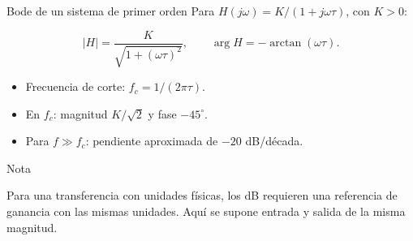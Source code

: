 \documentclass[
  10pt,
  ignorenonframetext,
  aspectratio=169,
  spanish,
]{beamer}
\providecommand{\tightlist}{%
  \setlength{\itemsep}{0pt}\setlength{\parskip}{0pt}}
\begin{document}
\begin{frame}{Bode de un sistema de primer orden}
\label{d3-045}
Para \(H(j\omega)=K/(1+j\omega\tau)\), con \(K>0\):

\[|H|=\frac{K}{\sqrt{1+(\omega\tau)^2}},\qquad
\arg H=-\arctan(\omega\tau).\]

\begin{itemize}
\tightlist
\item
  Frecuencia de corte: \(f_c=1/(2\pi\tau)\).
\item
  En \(f_c\): magnitud \(K/\sqrt2\) y fase \(-45^\circ\).
\item
  Para \(f\gg f_c\): pendiente aproximada de \(-20\) dB/década.
\end{itemize}

\begin{block}{Nota}

Para una transferencia con unidades físicas, los dB requieren una
referencia de ganancia con las mismas unidades. Aquí se supone entrada y
salida de la misma magnitud.

\end{block}

\end{frame}
\end{document}
